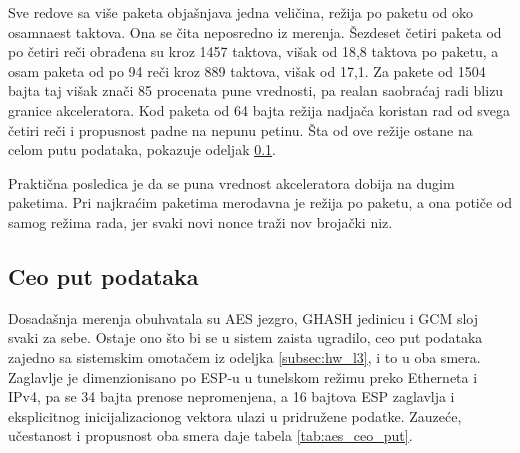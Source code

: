 Sve redove sa više paketa objašnjava jedna veličina, režija po paketu od oko osamnaest taktova. Ona se čita neposredno iz merenja. Šezdeset četiri paketa od po četiri reči obrađena su kroz 1457 taktova, višak od 18,8 taktova po paketu, a osam paketa od po 94 reči kroz 889 taktova, višak od 17,1. Za pakete od 1504 bajta taj višak znači 85 procenata pune vrednosti, pa realan saobraćaj radi blizu granice akceleratora. Kod paketa od 64 bajta režija nadjača koristan rad od svega četiri reči i propusnost padne na nepunu petinu. Šta od ove režije ostane na celom putu podataka, pokazuje odeljak \ref{subsec:rez_aes_ceo_put}.

Praktična posledica je da se puna vrednost akceleratora dobija na dugim paketima. Pri najkraćim paketima merodavna je režija po paketu, a ona potiče od samog režima rada, jer svaki novi nonce traži nov brojački niz.

\subsection{Ceo put podataka}
\label{subsec:rez_aes_ceo_put}

Dosadašnja merenja obuhvatala su AES jezgro, GHASH jedinicu i GCM sloj svaki za sebe. Ostaje ono što bi se u sistem zaista ugradilo, ceo put podataka zajedno sa sistemskim omotačem iz odeljka \ref{subsec:hw_l3}, i to u oba smera. Zaglavlje je dimenzionisano po ESP-u u tunelskom režimu preko Etherneta i IPv4, pa se 34 bajta prenose nepromenjena, a 16 bajtova ESP zaglavlja i eksplicitnog inicijalizacionog vektora ulazi u pridružene podatke. Zauzeće, učestanost i propusnost oba smera daje tabela \ref{tab:aes_ceo_put}.

\begin{table}[H]
\caption{Ceo put podataka nad paketima ESP tunela. Red \textit{GCM lanac} je GCM sloj sa AES jezgrom, red \textit{sa omotačem} isti lanac uz razdvajanje, sastavljanje i poravnanje oznake. Obe arhitekture su u LUT varijanti, a GHASH jedinica je jednotaktna}
\centering
{\renewcommand{\arraystretch}{1.25}
}
\label{tab:aes_ceo_put}
\end{table}

